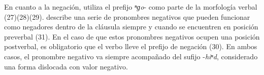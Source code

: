 En cuanto a la negación, utiliza el prefijo {\setmainfont{Charis SIL} \textit{ⁿɡo}-} como parte de la morfología verbal (27)(28)(29). \textcolor{MidnightBlue}{\citet{Huave}} describe una serie de pronombres negativos que pueden funcionar como negadores dentro de la cláusula siempre y cuando se encuentren en posición preverbal (31). En el caso de que estos pronombres negativos ocupen una posición postverbal, es obligatorio que el verbo lleve el prefijo de negación (30). En ambos casos, el pronombre negativo va siempre acompañado del sufijo {\setmainfont{Charis SIL} -\textit{hiⁿd}}, considerado una forma dislocada con valor negativo.
